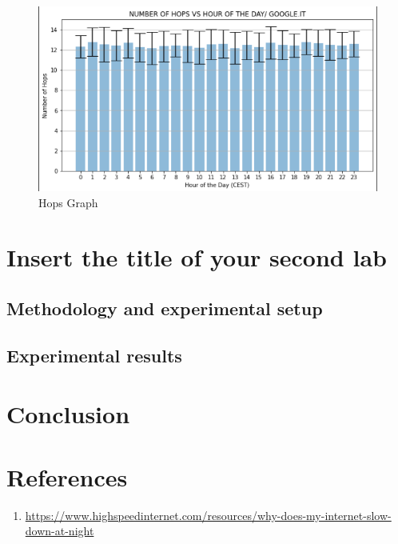 \documentclass[a4paper,10pt]{article}
\begin{document}
\begin{figure}[h!]
\centering
\includegraphics[scale=0.4]{hops_graph}
\caption{Hops Graph}
\label{fig:hops_graph}
\end{figure}




\section{Insert the title of your second lab}
\subsection{Methodology and experimental setup}
\subsection{Experimental results}
\section{Conclusion}


\clearpage

\section{References}


\begin{enumerate}

\item \label{article1}  \url{https://www.highspeedinternet.com/resources/why-does-my-internet-slow-down-at-night} 

\end{enumerate}
\end{document}
